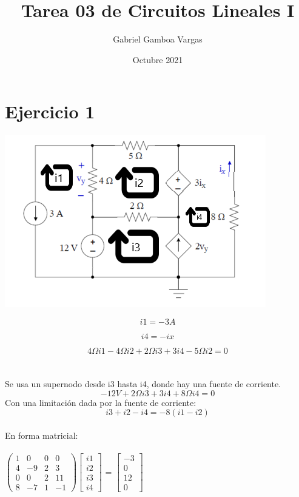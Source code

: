 \documentclass{article}
\title{Tarea 03 de Circuitos Lineales I}
\author{Gabriel Gamboa Vargas}
\date{Octubre 2021}
\begin{document}
\maketitle
\section{Ejercicio 1}
\includegraphics[]{images/ejercicio1.PNG}

\begin{equation} 
    i1 = -3A
\end{equation}
 
\begin{equation} 
    i4 = -ix
\end{equation}

\begin{equation} 
   {4\Omega} i1 - {4\Omega} i2 + {2\Omega}i3 +3i4 - {5\Omega}i2 = 0
\end{equation}
\\ \\
 Se usa un supernodo desde i3 hasta i4, donde hay una fuente de corriente.\\

\begin{equation}
   -12V + {2\Omega}i3 + 3i4 + {8\Omega}i4 = 0
\end{equation}
Con una limitación dada por la fuente de corriente: \\

\begin{equation}
   i3 + i2-i4 = -8(i1 -i2)
\end{equation}
\\ En forma matricial: \\ \\ 

$
\begin{pmatrix}
    1 & 0 & 0 & 0 \\
    4 & -9 & 2 & 3 \\
    0 & 0 & 2 & 11\\
    8 & -7 & 1 & -1
\end{pmatrix}
$$\begin{bmatrix}
    i1 \\
    i2 \\
    i3 \\
    i4 
\end{bmatrix}
$ = $\begin{bmatrix}
    -3 \\
    0 \\
    12  \\
    0
\end{bmatrix}
$ \\ \\ \\
\end{document}
